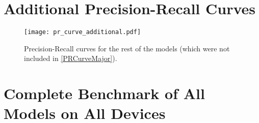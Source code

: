 \begin{appendices}
\label{Appendix}


\chapter{Additional Precision-Recall Curves}
\label{PRCurvesAdditional}
\begin{figure}[H]
    \begin{framed}
        \centering
        \texttt{[image: pr\_curve\_additional.pdf]}
        \caption{Precision-Recall curves for the rest of the models (which were
        not included in \autoref{PRCurveMajor}).}
    \end{framed}
\end{figure}






\chapter{Complete Benchmark of All Models on All Devices}
\label{mAPvsFPS}



\end{appendices}
